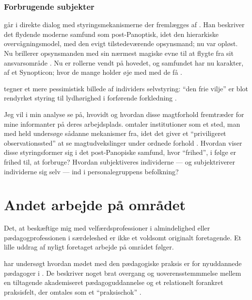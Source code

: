 \subsubsection{Forbrugende subjekter}

\citeauthor{baumanLiquidModernity2000} går i direkte dialog med styringsmekanismerne der fremlægges af \citeauthor{foucaultOvervagningOgStraf2005}.
Han beskriver det flydende moderne samfund som post-Panoptisk, idet den hierarkiske overvågningsmodel, med den evigt tilstedeværende opsynsmand; nu var opløst.
Nu brillerer opsynsmanden med sin nærmest magiske evne til at flygte fra sit ansvarsområde \autocite[s. 11]{baumanLiquidModernity2000}.
Nu er rollerne vendt på hovedet, og samfundet har nu karakter, af et Synopticon; hvor de mange holder øje med med de få \autocite[s. 85f]{baumanLiquidModernity2000}.

\citeauthor{baumanLiquidModernity2000} tegner et mere pessimistisk billede af individers selvstyring: “den frie vilje” er blot rendyrket styring til lydhørighed i forførende forkledning \autocite[s. 86]{baumanLiquidModernity2000}. 

Jeg vil i min analyse se på, hvovidt og hvordan disse magtforhold fremtræder for mine informanter på deres arbejdsplads.
\citeauthor{foucaultSubjectPower1982} omtaler institutioner som et sted, man med held undersøge sådanne mekanismer fra, idet det giver et “priviligeret observationssted” at se magtudvekslinger under ordnede forhold \autocite[s 791]{foucaultSubjectPower1982}. 
Hvordan viser disse styringsformer sig i det post-Panopiske samfund, hvor “frihed”, i følge \citeauthor{baumanLiquidModernity2000} er frihed til, at forbruge?
Hvordan subjektiveres individerne — og subjektriverer individerne sig selv — ind i personalegruppens befolkning? 

\section{Andet arbejde på området}
Det, at beskæftige mig med velfærdsprofessioner i almindelighed eller pædagogprofessionen i særdeleshed er ikke et voldsomt originalt foretagende.
Et lille uddrag af nyligt foretaget arbejde på området følger.

\citeauthor{nielsenAttraktivPaPapiret2017} har undersøgt hvordan mødet med den pædagogiske praksis er for nyuddannede pædagoger i .
De beskriver noget brat overgang og uoverensstemmmelse mellem en tiltagende akademiseret pædagoguddannelse og et relationelt forankret praksisfelt, der omtales som et “praksischok” \autocite{nielsenAttraktivPaPapiret2017}.

